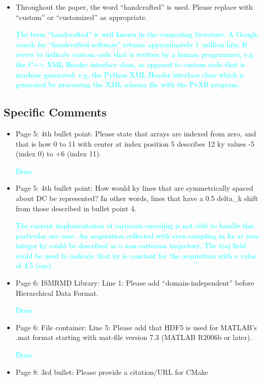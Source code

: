 \documentclass[12pt, draft]{article}
\makeatletter
\def\namedlabel#1#2{\begingroup#2\def\@currentlabel{#2}\phantomsection\label{#1}\endgroup}
\newcommand{\question}[1]{\item[\namedlabel{q#1}{#1}]}
\newcommand{\response}[1]{\textcolor{cyan}{#1}}
\makeatother
\begin{document}
{\begin{itemize}
\response{MATLAB is now capitalized throughout.}

\question{R2.15} Throughout the paper, the word ``handcrafted'' is used. Please replace with ``custom'' or ``customized'' as appropriate.

\response{The term ``handcrafted'' is well known in the computing literature. A Google search for ``handcrafted software'' returns approximately 1~million hits.  It serves to indicate custom code that is written by a human programmer, e.g. the C++ XML Header interface class, as opposed to custom code that is machine generated, e.g. the Python XML Header interface class which is generated by processing the XML schema file with the PyXB program.}

\end{itemize}

\subsection*{Specific Comments}
\begin{itemize}
\question{R2.16} Page 5: 4th bullet point: Please state that arrays are indexed from zero, and that is how 0 to 11 with center at index position 5 describes 12 ky values -5 (index 0) to +6 (index 11).

\response{Done}

\question{R2.17} Page 5: 4th bullet point: How would ky lines that are symmetrically spaced about DC be represented? In other words, lines that have a 0.5 delta\_k shift from those described in bullet point 4.

\response{The current implementation of cartesian encoding is not able to handle this particular use case.  An acquisition collected with even sampling in kx at non-integer ky could be described as a non-cartesian trajectory.  The traj field could be used to indicate that ky is constant for the acquisition with a value of 4.5 (say).}

\question{R2.18} Page 6: ISMRMD Library: Line 1: Please add ``domain-independent'' before Hierarchical Data Format.

\response{Done}

\question{R2.19} Page 6: File container: Line 5: Please add that HDF5 is used for MATLAB's .mat format starting with mat-file version 7.3 (MATLAB R2006b or later).

\response{Done}

\question{R2.20} Page 8: 3rd bullet: Please provide a citation/URL for CMake


\end{itemize}}
\end{document}
